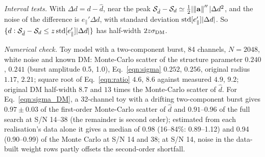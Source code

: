 \documentclass[twocolumn]{aastex631}
\providecommand{\DIFadd}[1]{{\protect\color{BLUE}#1}} %
\DeclareRobustCommand{\DIFaddend}{\DIFOaddend \let\includegraphics\DIFOincludegraphics} %
\begin{document}
\textit{\DIFadd{Interval tests.}} \DIFadd{With $\Delta d=d-\hat d$, near the peak $\mathcal{S}_{\hat d}-\mathcal{S}_d\simeq\tfrac12|\norm{\mathbf{a}}''|\Delta d^2$, and the noise of the difference is $e_\parallel'\Delta d$, with standard deviation ${\rm std}[e_\parallel']|\Delta d|$. So $\{d:\mathcal{S}_{\hat d}-\mathcal{S}_d\le z\,{\rm std}[e_\parallel']|\Delta d|\}$ has half-width $2z\sigma_{\rm DM}$.
}

\textit{\DIFadd{Numerical check.}} \DIFadd{Toy model with a two-component burst, 84 channels, $N=2048$, white noise and known DM: Monte-Carlo scatter of the structure parameter $0.240$, $0.241$ (burst amplitude 0.5, 1.0), Eq.~\eqref{eqn:sigma} $0.252$, $0.256$, original radius $1.17$, $2.21$; square root of Eq.~\eqref{eqn:ratio} $4.6$, $8.6$ against measured $4.9$, $9.2$; original DM half-width $8.7$ and $13$ times the Monte-Carlo scatter of $\hat d$. For Eq.~\eqref{eqn:sigma_DM}, a 32-channel toy with a drifting two-component burst gives $0.97\pm0.03$ of the first-order Monte-Carlo scatter of $\hat d$ and $0.91$--$0.96$ of the full search at S/N 14--38 (the remainder is second order); estimated from each realisation's data alone it gives a median of 0.98 (16--84\%: 0.89--1.12) and 0.94 (0.90--0.99) of the Monte Carlo at S/N 14 and 38; at S/N 14, noise in the data-built weight rows partly offsets the second-order shortfall}\DIFaddend .

%

\end{document}
